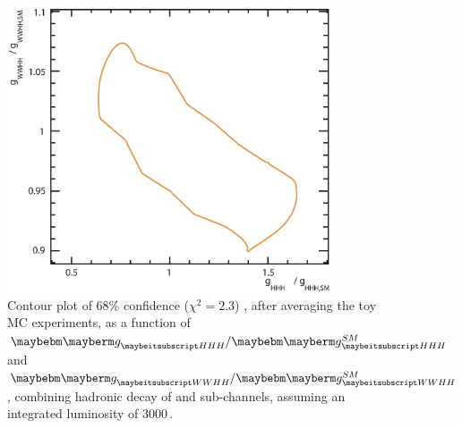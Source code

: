 \begin{figure}[!htbp]
    \includegraphics[width=0.85\textwidth]{doubleHiggs/extraction/new/contourCOmbineAve4}
\caption{Contour plot of 68\% confidence ($\chi^2 = 2.3$) , after averaging the toy MC experiments, as a function of $\gHHH/\gHHHSM$ and  $\gWWHH/\gWWHHSM$,  combining hadronic \WW  decay of \eeToHHbbWW and \eeToHHbbbb sub-channels, assuming an integrated luminosity of  3000\,.}
   \label{fig:doubleHiggsCouplingChi2Countour}
\end{figure} 